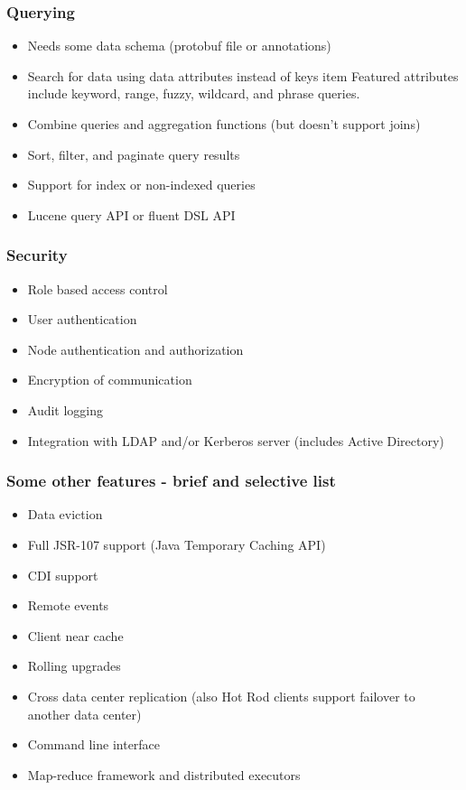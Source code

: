 \documentclass[10pt,utf8]{beamer}
\begin{document}
\begin{frame}
	\frametitle{Querying}
	\begin{itemize}
		\item Needs some data schema (protobuf file or annotations)
		\item Search for data using data attributes instead of keys
		item Featured attributes include keyword, range, fuzzy, wildcard, and phrase queries.
		\item Combine queries and aggregation functions (but doesn't support joins)
		\item Sort, filter, and paginate query results
		\item Support for index or non-indexed queries
		\item Lucene query API or fluent DSL API
	\end{itemize}
\end{frame}

\begin{frame}
	\frametitle{Security}
	\begin{itemize}
	 \item Role based access control
	 \item User authentication
	 \item Node authentication and authorization
	 \item Encryption of communication
	 \item Audit logging
	 \item Integration with LDAP and/or Kerberos server (includes Active Directory)
	\end{itemize}
\end{frame}


\begin{frame}
  \frametitle{Some other features - brief and selective list}
  \begin{itemize}
		\item Data eviction
		\item Full JSR-107 support (Java Temporary Caching API)
		\item CDI support
		\item Remote events
		\item Client near cache
		\item Rolling upgrades
		\item Cross data center replication (also Hot Rod clients support failover to another data center)
		\item Command line interface
		\item Map-reduce framework and distributed executors
  \end{itemize}
\end{frame}
\end{document}
